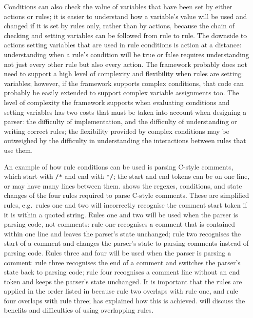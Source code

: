 Conditions can also check the value of variables that have been set by
either actions or rules; it is easier to understand how a variable's value
will be used and changed if it is set by rules only, rather than by
actions, because the chain of checking and setting variables can be
followed from rule to rule.  The downside to actions setting variables that
are used in rule conditions is action at a distance: understanding when a
rule's condition will be true or false requires understanding not just
every other rule but also every action.  The framework probably does not
need to support a high level of complexity and flexibility when rules are
setting variables; however, if the framework supports complex conditions,
that code can probably be easily extended to support complex variable
assignments too.  The level of complexity the framework supports when
evaluating conditions and setting variables has two costs that must be
taken into account when designing a parser: the difficulty of
implementation, and the difficulty of understanding or writing correct
rules; the flexibility provided by complex conditions may be outweighed by
the difficulty in understanding the interactions between rules that use
them.

An example of how rule conditions can be used is parsing C-style comments,
which start with \texttt{/*} and end with \texttt{*/}; the start and end
tokens can be on one line, or may have many lines between them.
 shows the regexes, conditions,
and state changes of the four rules required to parse C-style comments.
These are simplified rules, e.g.\ rules one and two will incorrectly
recognise the comment start token if it is within a quoted string.  Rules
one and two will be used when the parser is parsing code, not comments:
rule one recognises a comment that is contained within one line and leaves
the parser's state unchanged; rule two recognises the start of a comment
and changes the parser's state to parsing comments instead of parsing code.
Rules three and four will be used when the parser is parsing a comment:
rule three recognises the end of a comment and switches the parser's state
back to parsing code; rule four recognises a comment line without an end
token and keeps the parser's state unchanged.  It is important that the
rules are applied in the order listed in  because rule two overlaps with rule one, and rule four overlaps
with rule three;  has explained how this
is achieved.   will discuss
the benefits and difficulties of using overlapping rules.

